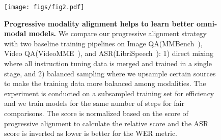 \begin{figure}[t]
\centering
\texttt{[image: figs/fig2.pdf]} 
\caption{\textbf{Progressive modality alignment helps to learn better omni-modal models. } We compare our progressive alignment strategy with two baseline training pipelines on Image QA(MMBench~\citep{liu2023mmbench}), Video QA(VideoMME~\citep{fu2024videomme}), and ASR(LibriSpeech~\citep{panayotov2015librispeech}): 1) direct mixing where all instruction tuning data is merged and trained in a single stage, and 2) balanced sampling where we upsample certain sources to make the training data more balanced among modalities. The experiment is conducted on a subsampled training set for efficiency and we train models for the same number of steps for fair comparisons. The score is normalized based on the score of progressive alignment to calculate the relative score and the ASR score is inverted as lower is better for the WER metric.}
\label{fig:progressive}
\end{figure}



